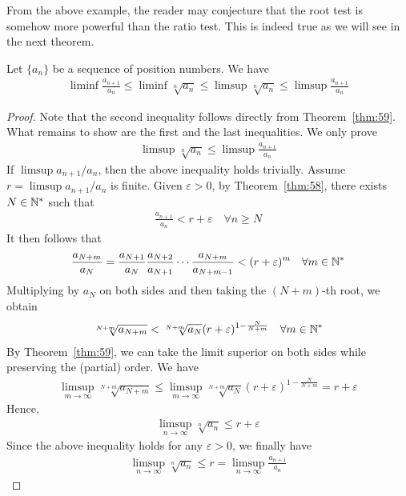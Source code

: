 \documentclass[thmcnt=section, 12pt]{my-elegantbook}
\begin{document}
From the above example, the reader may conjecture that the root test is somehow more powerful than the ratio test. This is indeed true as we will see in the next theorem.

\begin{theorem}
    Let $\{a_n\}$ be a sequence of position numbers. We have 
    \begin{align*}
        \liminf \frac{a_{n+1}}{a_n}
        \leq \liminf \sqrt[n]{a_n}
        \leq \limsup \sqrt[n]{a_n}
        \leq \limsup \frac{a_{n+1}}{a_n}
    \end{align*}
\end{theorem}

\begin{proof}
    Note that the second inequality follows directly from Theorem~\ref{thm:59}. What remains to show are the first and the last inequalities. We only prove
    \begin{align*}
        \limsup \sqrt[n]{a_n}
        \leq \limsup \frac{a_{n+1}}{a_n}
    \end{align*}
    If $\limsup a_{n+1} / {a_n}$, then the above inequality holds trivially. Assume $r = \limsup a_{n+1} / {a_n}$ is finite. Given $\varepsilon > 0$, by Theorem~\ref{thm:58}, there exists $N \in \mathbb{N}^\ast$ such that 
    \begin{align*}
        \frac{a_{n+1}}{a_n} < r + \varepsilon
        \quad \forall n \geq N
    \end{align*}
    It then follows that 
    \begin{align*}
        \frac{a_{N+m}}{a_N}
        = \frac{a_{N+1}}{a_{N}} 
            \frac{a_{N+2}}{a_{N+1}}
            \cdots \frac{a_{N+m}}{a_{N+m-1}}
        < (r + \varepsilon)^m
        \quad \forall m \in \mathbb{N}^\ast
    \end{align*}
    Multiplying by $a_N$ on both sides and then taking the $(N+m)$-th root, we obtain
    \begin{align*}
        \sqrt[N+m]{a_{N+m}}
        < \sqrt[N+m]{a_{N}} (r+\varepsilon)^{1 - \frac{N}{N + m}}
        \quad \forall m \in \mathbb{N}^\ast
    \end{align*}
    By Theorem~\ref{thm:59}, we can take the limit superior on both sides while preserving the (partial) order. We have 
    \begin{align*}
        \limsup_{m \to \infty} \sqrt[N+m]{a_{N+m}}
        \leq \limsup_{m \to \infty} \sqrt[N+m]{a_{N}} (r+\varepsilon)^{1 - \frac{N}{N + m}}
        = r + \varepsilon
    \end{align*}
    Hence, 
    \begin{align*}
        \limsup_{n \to \infty} \sqrt[n]{a_{n}}
        \leq r + \varepsilon
    \end{align*}
    Since the above inequality holds for any $\varepsilon > 0$, we finally have
    \begin{align*}
        \limsup_{n \to \infty} \sqrt[n]{a_{n}}
        \leq r
        = \limsup_{n \to \infty} \frac{a_{n+1}}{a_n}
    \end{align*}
\end{proof}
\end{document}
